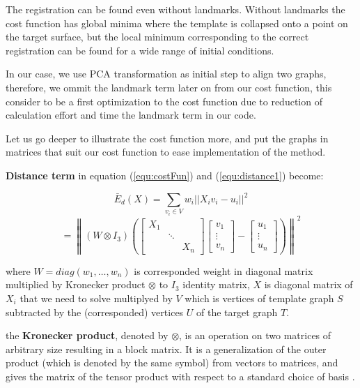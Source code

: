 \documentclass[../structure.tex]{subfiles}
\begin{document}
The registration can be found even without landmarks. Without landmarks the cost function has global minima where the template is collapsed onto a point on the target surface, but the local minimum corresponding to the correct registration can be found for a wide range of initial conditions.

In our case, we use PCA transformation as initial step to align two graphs, therefore, we ommit the landmark term later on from our cost function, this consider to be a first optimization to the cost function due to reduction of calculation effort and time the landmark term in our code.

Let us go deeper to illustrate the cost function more, and put the graphs in matrices that suit our cost function to ease implementation of the method.

\textbf{Distance term} in equation (\ref{equ:costFun}) and (\ref{equ:distance1}) become:

\begin{equation}
\bar{E}_{d}(X) = \sum_{v_{i}\in V} w_{i}||X_{i}v_{i}-u_{i}||^2
\label{equ:distance2}
\end{equation}
\begin{equation*}
= \left\|(W \otimes I_{3}) \left( 
\begin{bmatrix}
X_{1} & & \\ 
 & \ddots & \\
 & & X_{n}
\end{bmatrix}
\begin{bmatrix}
v_{1} \\ \vdots \\ v_{n}
\end{bmatrix} - 
\begin{bmatrix}
u_{1}\\ \vdots \\ u_{n}
\end{bmatrix}
\right) \right\|^2
\end{equation*}

where $W = diag(w_{1},\dots, w_{n})$ is corresponded weight in diagonal matrix multiplied by Kronecker product $\otimes$ to $I_{3}$ identity matrix, $X$ is diagonal matrix of $X_{i}$ that we need to solve multiplyed by $V$ which is vertices of template graph $S$ subtracted by the (corresponded) vertices $U$ of the target graph $T$.

the \textbf{Kronecker product}, denoted by $\otimes$, is an operation on two matrices of arbitrary size resulting in a block matrix. It is a generalization of the outer product (which is denoted by the same symbol) from vectors to matrices, and gives the matrix of the tensor product with respect to a standard choice of basis \cite{Wikipedia2019}.
\end{document}
